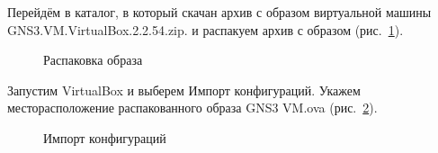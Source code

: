 \documentclass[
  english,
  russian,
  12pt,
  a4paper,
  DIV=11,
  numbers=noendperiod]{scrreprt}
\begin{document}
Перейдём в каталог, в который скачан архив с образом виртуальной машины
GNS3.VM.VirtualBox.2.2.54.zip. и распакуем архив с образом
(рис.~\ref{fig-005}).

\begin{figure}


\caption{\label{fig-005}Распаковка образа}

\end{figure}%

Запустим VirtualBox и выберем Импорт конфигураций. Укажем
месторасположение распакованного образа GNS3 VM.ova
(рис.~\ref{fig-006}).

\begin{figure}


\caption{\label{fig-006}Импорт конфигураций}

\end{figure}%
\end{document}
